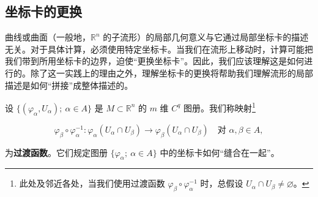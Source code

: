 \subsection*{坐标卡的更换}

曲线或曲面（一般地，$ \mathbb{R}^{n} $ 的子流形）的局部几何意义与它通过局部坐标卡的描述无关。对于具体计算，必须使用特定坐标卡。当我们在流形上移动时，计算可能把我们带到所用坐标卡的边界，迫使“更换坐标卡”。因此，我们应该理解这是如何进行的。除了这一实践上的理由之外，理解坐标卡的更换将帮助我们理解流形的局部描述是如何“拼接”成整体描述的。

设 $ \{(\varphi_{\alpha}, U_{\alpha}) ; \ \alpha \in A\} $ 是 $ M \subset \mathbb{R}^{n} $ 的 $ m $ 维 $ C^{q} $ 图册。我们称映射\footnote{此处及邻近各处，当我们使用过渡函数 $ \varphi_{\beta} \circ \varphi_{\alpha}^{-1} $ 时，总假设 $ U_{\alpha} \cap U_{\beta} \ne \varnothing $。}

\[
\varphi_{\beta} \circ \varphi_{\alpha}^{-1} : \varphi_{\alpha}(U_{\alpha} \cap U_{\beta}) \to \varphi_{\beta}(U_{\alpha} \cap U_{\beta}) \quad \text{对 } \alpha, \beta \in A ,
\]

为\textbf{过渡函数}。它们规定图册 $ \{\varphi_{\alpha} ; \ \alpha \in A\} $ 中的坐标卡如何“缝合在一起”。


